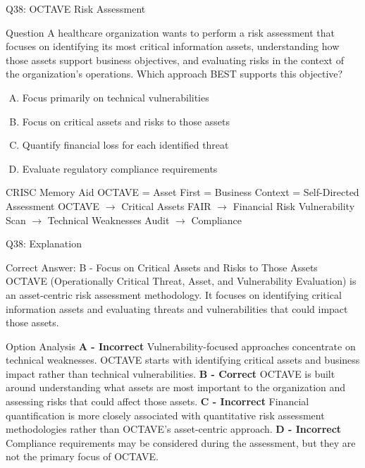 \documentclass{beamer}
\begin{document}
	
	\begin{frame}{Q38: OCTAVE Risk Assessment} \begin{block}{Question} A healthcare organization wants to perform a risk assessment that focuses on identifying its most critical information assets, understanding how those assets support business objectives, and evaluating risks in the context of the organization's operations. Which approach BEST supports this objective? \end{block} \begin{enumerate}[(A)] \item Focus primarily on technical vulnerabilities \item Focus on critical assets and risks to those assets \item Quantify financial loss for each identified threat \item Evaluate regulatory compliance requirements \end{enumerate} \begin{block}{CRISC Memory Aid} OCTAVE = Asset First = Business Context = Self-Directed Assessment \vspace{0.15cm} OCTAVE $\rightarrow$ Critical Assets FAIR $\rightarrow$ Financial Risk Vulnerability Scan $\rightarrow$ Technical Weaknesses Audit $\rightarrow$ Compliance \end{block} \end{frame} \begin{frame}[shrink=10]{Q38: Explanation} \footnotesize \begin{block}{Correct Answer: B - Focus on Critical Assets and Risks to Those Assets} OCTAVE (Operationally Critical Threat, Asset, and Vulnerability Evaluation) is an asset-centric risk assessment methodology. It focuses on identifying critical information assets and evaluating threats and vulnerabilities that could impact those assets. \end{block} \begin{block}{Option Analysis} \textbf{A - Incorrect} Vulnerability-focused approaches concentrate on technical weaknesses. OCTAVE starts with identifying critical assets and business impact rather than technical vulnerabilities. \vspace{0.15cm} \textbf{B - Correct} OCTAVE is built around understanding what assets are most important to the organization and assessing risks that could affect those assets. \vspace{0.15cm} \textbf{C - Incorrect} Financial quantification is more closely associated with quantitative risk assessment methodologies rather than OCTAVE's asset-centric approach. \vspace{0.15cm} \textbf{D - Incorrect} Compliance requirements may be considered during the assessment, but they are not the primary focus of OCTAVE. \end{block}  \end{frame}
	
\end{document}
